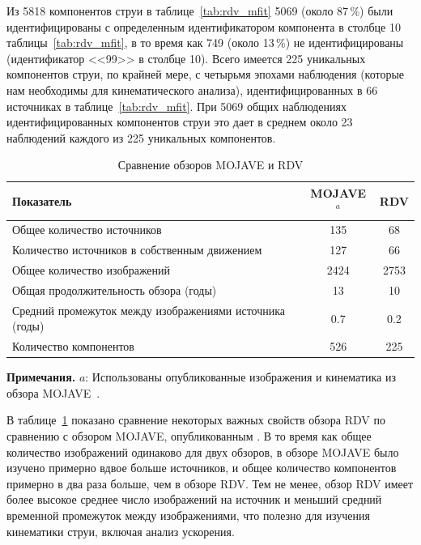 Из 5818 компонентов струи в таблице~\ref{tab:rdv_mfit} 5069 (около 87\,\%) были идентифицированы с
определенным идентификатором компонента в столбце 10 таблицы~\ref{tab:rdv_mfit}, в то время как 749
(около 13\,\%) не идентифицированы (идентификатор <<99>> в столбце 10). Всего имеется 225 уникальных
компонентов струи, по крайней мере, с четырьмя эпохами наблюдения (которые нам необходимы для
кинематического анализа), идентифицированных в 66 источниках в таблице~\ref{tab:rdv_mfit}. При 5069
общих наблюдениях идентифицированных компонентов струи это дает в среднем около 23 наблюдений
каждого из 225 уникальных компонентов.

\begin{table}
\caption{Сравнение обзоров MOJAVE и RDV}
\label{tab:rdv_comptab}
\small
\centering
\begin{tabular}{l c c}
\toprule
Показатель & MOJAVE$^{a}$ & RDV \\
\midrule
Общее количество источников                             & 135  & 68   \\
Количество источников в собственным движением           & 127  & 66   \\
Общее количество изображений                            & 2424 & 2753 \\
Общая продолжительность обзора (годы)                   & 13   & 10   \\
Средний промежуток между изображениями источника (годы) & 0.7  & 0.2  \\
Количество компонентов                                  & 526  & 225  \\
\bottomrule
\end{tabular}

\textbf{Примечания.}
$a$: Использованы опубликованные изображения и кинематика из обзора
MOJAVE~\cite{Lister_2009a,Lister_2009b}.
\end{table}

В таблице~\ref{tab:rdv_comptab} показано сравнение некоторых важных свойств обзора RDV по сравнению
с обзором MOJAVE, опубликованным \cite{Lister_2009a,Lister_2009b}. В то время как общее количество
изображений одинаково для двух обзоров, в обзоре MOJAVE было изучено примерно вдвое больше
источников, и общее количество компонентов примерно в два раза больше, чем в обзоре RDV. Тем не
менее, обзор RDV имеет более высокое среднее число изображений на источник и меньший средний
временной промежуток между изображениями, что полезно для изучения кинематики струи, включая анализ
ускорения.


